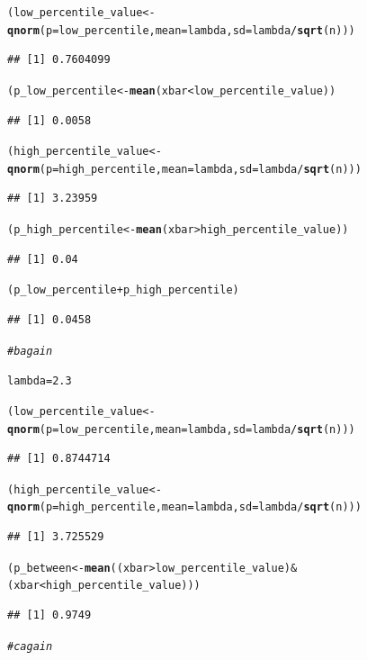 \documentclass{article}\usepackage[]{graphicx}\usepackage[]{xcolor}
\makeatletter
\newcommand{\hlnum}[1]{\textcolor[rgb]{0.686,0.059,0.569}{#1}}%
\newcommand{\hlcom}[1]{\textcolor[rgb]{0.678,0.584,0.686}{\textit{#1}}}%
\newcommand{\hlopt}[1]{\textcolor[rgb]{0,0,0}{#1}}%
\newcommand{\hldef}[1]{\textcolor[rgb]{0.345,0.345,0.345}{#1}}%
\newcommand{\hlkwb}[1]{\textcolor[rgb]{0.69,0.353,0.396}{#1}}%
\newcommand{\hlkwc}[1]{\textcolor[rgb]{0.333,0.667,0.333}{#1}}%
\newcommand{\hlkwd}[1]{\textcolor[rgb]{0.737,0.353,0.396}{\textbf{#1}}}%
\newenvironment{kframe}{%
 \def\at@end@of@kframe{}%
 \ifinner\ifhmode%
  \def\at@end@of@kframe{\end{minipage}}%
  \begin{minipage}{\columnwidth}%
 \fi\fi%
 \def\FrameCommand##1{\hskip\@totalleftmargin \hskip-\fboxsep
 \colorbox{shadecolor}{##1}\hskip-\fboxsep
     \hskip-\linewidth \hskip-\@totalleftmargin \hskip\columnwidth}%
 \MakeFramed {\advance\hsize-\width
   \@totalleftmargin\z@ \linewidth\hsize
   \@setminipage}}%
 {\par\unskip\endMakeFramed%
 \at@end@of@kframe}
\newenvironment{knitrout}{}{} %
\makeatother
\begin{document}
\begin{enumerate}
\begin{knitrout}
\begin{kframe}
\begin{alltt}
\hldef{(low_percentile_value} \hlkwb{<-} \hlkwd{qnorm}\hldef{(}\hlkwc{p} \hldef{= low_percentile,} \hlkwc{mean} \hldef{= lambda,} \hlkwc{sd} \hldef{= lambda}\hlopt{/}\hlkwd{sqrt}\hldef{(n)))}
\end{alltt}
\begin{verbatim}
## [1] 0.7604099
\end{verbatim}
\begin{alltt}
\hldef{(p_low_percentile} \hlkwb{<-} \hlkwd{mean}\hldef{(xbar}\hlopt{<}\hldef{low_percentile_value))}
\end{alltt}
\begin{verbatim}
## [1] 0.0058
\end{verbatim}
\begin{alltt}
\hldef{(high_percentile_value} \hlkwb{<-} \hlkwd{qnorm}\hldef{(}\hlkwc{p} \hldef{= high_percentile,} \hlkwc{mean} \hldef{= lambda,} \hlkwc{sd} \hldef{= lambda}\hlopt{/}\hlkwd{sqrt}\hldef{(n)))}
\end{alltt}
\begin{verbatim}
## [1] 3.23959
\end{verbatim}
\begin{alltt}
\hldef{(p_high_percentile} \hlkwb{<-} \hlkwd{mean}\hldef{(xbar}\hlopt{>}\hldef{high_percentile_value))}
\end{alltt}
\begin{verbatim}
## [1] 0.04
\end{verbatim}
\begin{alltt}
\hldef{(p_low_percentile} \hlopt{+} \hldef{p_high_percentile)}
\end{alltt}
\begin{verbatim}
## [1] 0.0458
\end{verbatim}
\begin{alltt}
\hlcom{#b again}

\hldef{lambda} \hlkwb{=} \hlnum{2.3}

\hldef{(low_percentile_value} \hlkwb{<-} \hlkwd{qnorm}\hldef{(}\hlkwc{p} \hldef{= low_percentile,} \hlkwc{mean} \hldef{= lambda,} \hlkwc{sd} \hldef{= lambda}\hlopt{/}\hlkwd{sqrt}\hldef{(n)))}
\end{alltt}
\begin{verbatim}
## [1] 0.8744714
\end{verbatim}
\begin{alltt}
\hldef{(high_percentile_value} \hlkwb{<-} \hlkwd{qnorm}\hldef{(}\hlkwc{p} \hldef{= high_percentile,} \hlkwc{mean} \hldef{= lambda,} \hlkwc{sd} \hldef{= lambda}\hlopt{/}\hlkwd{sqrt}\hldef{(n)))}
\end{alltt}
\begin{verbatim}
## [1] 3.725529
\end{verbatim}
\begin{alltt}
\hldef{(p_between} \hlkwb{<-} \hlkwd{mean}\hldef{((xbar}\hlopt{>}\hldef{low_percentile_value)} \hlopt{&} \hldef{(xbar}\hlopt{<}\hldef{high_percentile_value)))}
\end{alltt}
\begin{verbatim}
## [1] 0.9749
\end{verbatim}
\begin{alltt}
\hlcom{#c again}


\end{alltt}
\end{kframe}
\end{knitrout}
\end{enumerate}
\end{document}
